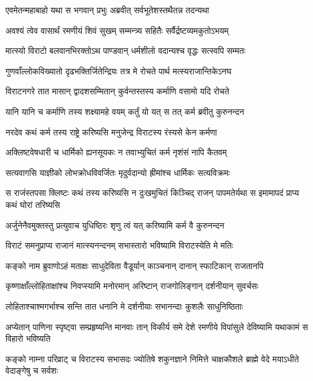 \twolineshloka
{एवमेतन्महाबाहो यथा स भगवान् प्रभुः}
{अब्रवीत् सर्वभूतेशस्तथैतन्न तदन्यथा}


\twolineshloka
{अवश्यं त्वेव वासार्थं रमणीयं शिवं सुखम्}
{सम्मन्त्र्य सहितैः सर्वैर्द्रष्टव्यमकुतोऽभयम्}


\twolineshloka
{मात्स्यो विराटो बलवानभिरक्तोऽथ पाण्डवान्}
{धर्मशीलो वदान्यश्च वृद्धः सत्स्वपि सम्मतः}


\twolineshloka
{गुणवाँल्लोकविख्यातो दृढभक्तिर्जितेन्द्रियः}
{तत्र मे रोचते पार्थ मत्स्यराजान्तिकेऽनघ}


\twolineshloka
{विराटनगरे तात मासान् द्वादशसम्मितान्}
{कुर्वन्तस्तस्य कर्माणि वसामो यदि रोचते}


\twolineshloka
{यानि यानि च कर्माणि तस्य शक्ष्यामहे वयम्}
{कर्तुं यो यत् स तत् कर्म ब्रवीतु कुरुनन्दन}



\twolineshloka
{नरदेव कथं कर्म तस्य राष्ट्रे करिष्यसि}
{मनुजेन्द्र विराटस्य रंस्यसे केन कर्मणा}


\twolineshloka
{अक्लिष्टवेषधारी च धार्मिको ह्यनसूयकः}
{न तवाभ्युचितं कर्म नृशंसं नापि कैतवम्}


\twolineshloka
{सत्यवागसि याज्ञीको लोभक्रोधविवर्जितः}
{मृदुर्वदान्यो ह्रीमांश्च धार्मिकः सत्यविक्रमः}


\threelineshloka
{स राजंस्तपसा क्लिष्टः कथं तस्य करिष्यसि}
{न दुःखमुचितं किञ्चिद् राजन् पापमतेर्यथा}
{स इमामापदं प्राप्य कथं घोरां तरिष्यसि}



\twolineshloka
{अर्जुनेनैवमुक्तस्तु प्रत्युवाच युधिष्ठिरः}
{शृणु त्वं यत् करिष्यामि कर्म वै कुरुनन्दन}


\twolineshloka
{विराटं समनुप्राप्य राजानं मात्स्यनन्दनम्}
{सभास्तारो भविष्यामि विराटस्येति मे मतिः}


\twolineshloka
{कङ्को नाम ब्रुवाणोऽहं मताक्षः साधुदेविता}
{वैडूर्यान् काञ्चनान् दानान् स्फाटिकान् राजतानपि}


\twolineshloka
{कृष्णाक्षाँल्लोहिताक्षांश्च निवप्स्यामि मनोरमान्}
{अरिष्टान् राजगोलिङ्गान् दर्शनीयान् सुवर्चसः}


\twolineshloka
{लोहिताश्चाश्मगर्भाश्च सन्ति तात धनानि मे}
{दर्शनीयाः सभानन्दाः कुशलैः साधुनिष्ठिताः}


\onelineshloka
{अप्येतान् पाणिना स्पृष्ट्वा सम्प्रहृष्यन्ति मानवाः}
\twolineshloka
{तान् विकीर्य समे देशे रमणीये विपांसुले}
{देविष्यामि यथाकामं स विहारो भविष्यति}


\threelineshloka
{कङ्को नाम्ना परिव्राट् च विराटस्य सभासदः}
{ज्योतिषे शकुनज्ञाने निमित्ते चाक्षकौशले}
{ब्राह्मे वेदे मयाऽधीते वेदाङ्गेषु च सर्वशः}


